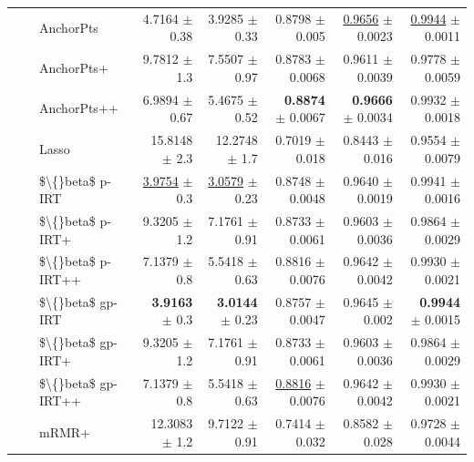 \begin{longtable}{llp{}rrrrr}
 &  & AnchorPts & 4.7164 {\scriptsize $\pm$ 0.38} & 3.9285 {\scriptsize $\pm$ 0.33} & 0.8798 {\scriptsize $\pm$ 0.005} & \underline{0.9656} {\scriptsize $\pm$ 0.0023} & \underline{0.9944} {\scriptsize $\pm$ 0.0011} \\
 &  & AnchorPts+ & 9.7812 {\scriptsize $\pm$ 1.3} & 7.5507 {\scriptsize $\pm$ 0.97} & 0.8783 {\scriptsize $\pm$ 0.0068} & 0.9611 {\scriptsize $\pm$ 0.0039} & 0.9778 {\scriptsize $\pm$ 0.0059} \\
 &  & AnchorPts++ & 6.9894 {\scriptsize $\pm$ 0.67} & 5.4675 {\scriptsize $\pm$ 0.52} & \textbf{0.8874} {\scriptsize $\pm$ 0.0067} & \textbf{0.9666} {\scriptsize $\pm$ 0.0034} & 0.9932 {\scriptsize $\pm$ 0.0018} \\
 &  & Lasso & 15.8148 {\scriptsize $\pm$ 2.3} & 12.2748 {\scriptsize $\pm$ 1.7} & 0.7019 {\scriptsize $\pm$ 0.018} & 0.8443 {\scriptsize $\pm$ 0.016} & 0.9554 {\scriptsize $\pm$ 0.0079} \\
 &  & \$\textbackslash\{\}beta\$ p-IRT & \underline{3.9754} {\scriptsize $\pm$ 0.3} & \underline{3.0579} {\scriptsize $\pm$ 0.23} & 0.8748 {\scriptsize $\pm$ 0.0048} & 0.9640 {\scriptsize $\pm$ 0.0019} & 0.9941 {\scriptsize $\pm$ 0.0016} \\
 &  & \$\textbackslash\{\}beta\$ p-IRT+ & 9.3205 {\scriptsize $\pm$ 1.2} & 7.1761 {\scriptsize $\pm$ 0.91} & 0.8733 {\scriptsize $\pm$ 0.0061} & 0.9603 {\scriptsize $\pm$ 0.0036} & 0.9864 {\scriptsize $\pm$ 0.0029} \\
 &  & \$\textbackslash\{\}beta\$ p-IRT++ & 7.1379 {\scriptsize $\pm$ 0.8} & 5.5418 {\scriptsize $\pm$ 0.63} & 0.8816 {\scriptsize $\pm$ 0.0076} & 0.9642 {\scriptsize $\pm$ 0.0042} & 0.9930 {\scriptsize $\pm$ 0.0021} \\
 &  & \$\textbackslash\{\}beta\$ gp-IRT & \textbf{3.9163} {\scriptsize $\pm$ 0.3} & \textbf{3.0144} {\scriptsize $\pm$ 0.23} & 0.8757 {\scriptsize $\pm$ 0.0047} & 0.9645 {\scriptsize $\pm$ 0.002} & \textbf{0.9944} {\scriptsize $\pm$ 0.0015} \\
 &  & \$\textbackslash\{\}beta\$ gp-IRT+ & 9.3205 {\scriptsize $\pm$ 1.2} & 7.1761 {\scriptsize $\pm$ 0.91} & 0.8733 {\scriptsize $\pm$ 0.0061} & 0.9603 {\scriptsize $\pm$ 0.0036} & 0.9864 {\scriptsize $\pm$ 0.0029} \\
 &  & \$\textbackslash\{\}beta\$ gp-IRT++ & 7.1379 {\scriptsize $\pm$ 0.8} & 5.5418 {\scriptsize $\pm$ 0.63} & \underline{0.8816} {\scriptsize $\pm$ 0.0076} & 0.9642 {\scriptsize $\pm$ 0.0042} & 0.9930 {\scriptsize $\pm$ 0.0021} \\
 &  & mRMR+ & 12.3083 {\scriptsize $\pm$ 1.2} & 9.7122 {\scriptsize $\pm$ 0.91} & 0.7414 {\scriptsize $\pm$ 0.032} & 0.8582 {\scriptsize $\pm$ 0.028} & 0.9728 {\scriptsize $\pm$ 0.0044} \\

\end{longtable}
